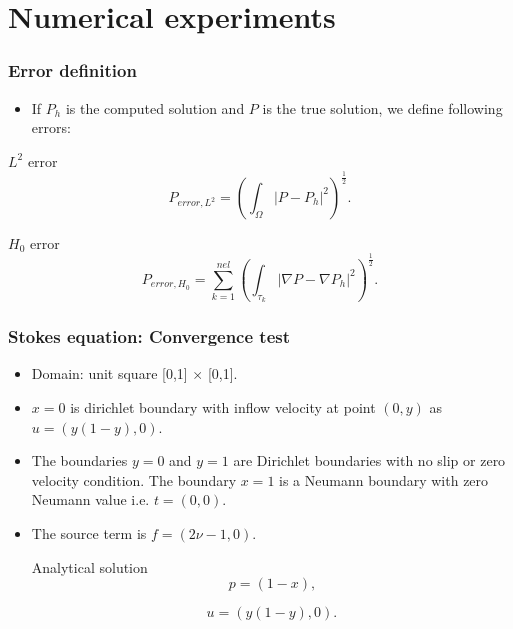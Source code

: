 \documentclass{beamer}
\begin{document}
\section{Numerical experiments}
\begin{frame}
\frametitle{Error definition}
\begin{itemize}
\item If $P_h$ is the computed solution and $P$ is the true solution, we define following errors:
\end{itemize}
\begin{block}{$L^2$ error}
\begin{equation}
P_{error,L^2} = (\int_{\Omega} |P - P_h|^2 )^\frac{1}{2} \mathrm{.}
\end{equation}
\end{block}
\begin{block}{$H_0$ error}
\begin{equation}
P_{error,H_0} = \sum_{k=1}^{nel} (\int_{\tau_k} |\nabla P - \nabla P_h|^2)^\frac{1}{2} \mathrm{.}
\end{equation}
\end{block}
\end{frame}
\begin{frame}
\frametitle{Stokes equation: Convergence test}
\begin{itemize}
\item Domain: unit square [0,1] $\times$ [0,1].
\item ${x=0}$ is dirichlet boundary with inflow velocity at point $(0,y)$ as $u = (y(1-y), 0)$.
\item The boundaries ${y = 0}$ and ${y = 1}$ are Dirichlet boundaries with no slip or zero velocity condition. The boundary ${x = 1}$ is a Neumann boundary with zero Neumann value i.e. $t = (0, 0)$. 
\item The source term is $f = (2 \nu - 1, 0)$.

\begin{block}{Analytical solution}
\begin{equation}
p = (1 - x) \textrm{,}
\end{equation}

\begin{equation} 
 u = (y(1-y), 0) \textrm{.}
\end{equation}
\end{block}
\end{itemize}
\end{frame}
\end{document}
